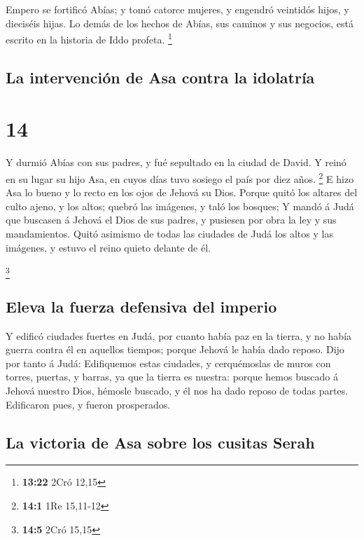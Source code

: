  Empero se fortificó Abías; y tomó catorce mujeres, y
engendró veintidós hijos, y dieciséis hijas.  Lo demás de
los hechos de Abías, sus caminos y sus negocios, está escrito en la
historia de Iddo profeta. \footnote{\textbf{13:22} 2Cró 12,15}

\hypertarget{la-intervenciuxf3n-de-asa-contra-la-idolatruxeda}{%
\subsection{La intervención de Asa contra la
idolatría}\label{la-intervenciuxf3n-de-asa-contra-la-idolatruxeda}}

\hypertarget{section-13}{%
\section{14}\label{section-13}}

 Y durmió Abías con sus padres, y fué sepultado en la ciudad
de David. Y reinó en su lugar su hijo Asa, en cuyos días tuvo sosiego el
país por diez años. \footnote{\textbf{14:1} 1Re 15,11-12}  E
hizo Asa lo bueno y lo recto en los ojos de Jehová su Dios. 
Porque quitó los altares del culto ajeno, y los altos; quebró las
imágenes, y taló los bosques;  Y mandó á Judá que buscasen á
Jehová el Dios de sus padres, y pusiesen por obra la ley y sus
mandamientos.  Quitó asimismo de todas las ciudades de Judá
los altos y las imágenes, y estuvo el reino quieto delante de él.

\footnote{\textbf{14:5} 2Cró 15,15}

\hypertarget{eleva-la-fuerza-defensiva-del-imperio}{%
\subsection{Eleva la fuerza defensiva del
imperio}\label{eleva-la-fuerza-defensiva-del-imperio}}

 Y edificó ciudades fuertes en Judá, por cuanto había paz en
la tierra, y no había guerra contra él en aquellos tiempos; porque
Jehová le había dado reposo.  Dijo por tanto á Judá:
Edifiquemos estas ciudades, y cerquémoslas de muros con torres, puertas,
y barras, ya que la tierra es nuestra: porque hemos buscado á Jehová
nuestro Dios, hémosle buscado, y él nos ha dado reposo de todas partes.
Edificaron pues, y fueron prosperados.

\hypertarget{la-victoria-de-asa-sobre-los-cusitas-serah}{%
\subsection{La victoria de Asa sobre los cusitas
Serah}\label{la-victoria-de-asa-sobre-los-cusitas-serah}}

